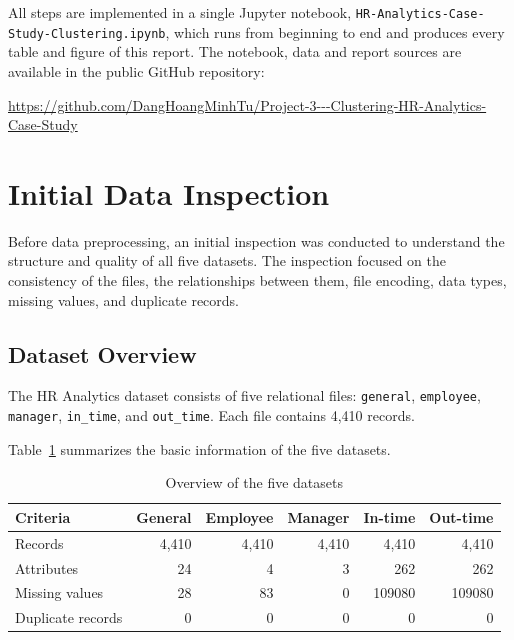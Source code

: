 \documentclass[12pt,a4paper]{article}
\begin{document}
All steps are implemented in a single Jupyter notebook,
\nolinkurl{HR-Analytics-Case-Study-Clustering.ipynb}, which runs from beginning
to end and produces every table and figure of this report. The notebook,
data and report sources are available in the public GitHub repository:
\begin{center}
{\footnotesize\url{https://github.com/DangHoangMinhTu/Project-3---Clustering-HR-Analytics-Case-Study}}
\end{center}


\section{Initial Data Inspection}
\label{sec:inspection}

Before data preprocessing, an initial inspection was conducted
to understand the structure and quality of all five datasets.
The inspection focused on the consistency of the files, the
relationships between them, file encoding, data types,
missing values, and duplicate records.

\subsection{Dataset Overview}

The HR Analytics dataset consists of five relational files:
\texttt{general}, \texttt{employee}, \texttt{manager},
\texttt{in\_time}, and \texttt{out\_time}.
Each file contains 4,410 records.

Table~\ref{tab:dataset-overview} summarizes the basic
information of the five datasets.

\begin{table}[H]
\centering
\caption{Overview of the five datasets}
\label{tab:dataset-overview}
\small
\begin{tabular}{lrrrrr}
\toprule
\textbf{Criteria}
& \textbf{General}
& \textbf{Employee}
& \textbf{Manager}
& \textbf{In-time}
& \textbf{Out-time}\\
\midrule
Records & 4,410 & 4,410 & 4,410 & 4,410 & 4,410\\
Attributes & 24 & 4 & 3 & 262 & 262\\
Missing values & 28 & 83 & 0 & 109080 & 109080\\
Duplicate records & 0 & 0 & 0 & 0 & 0\\
\bottomrule
\end{tabular}
\end{table}
\end{document}
